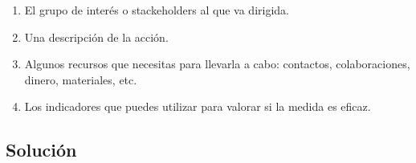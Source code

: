 \begin{enumerate}
    \item El grupo de interés o stackeholders al que va dirigida.
    \item Una descripción de la acción.
    \item Algunos recursos que necesitas para llevarla a cabo: contactos, colaboraciones, dinero, materiales, etc.
    \item Los indicadores que puedes utilizar para valorar si la medida es eficaz.
\end{enumerate}

\subsection{Solución}


\newpage



